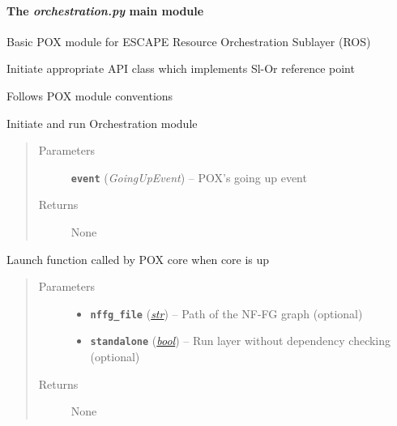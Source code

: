 \documentclass[letterpaper,10pt,english]{sphinxmanual}
\begin{document}
\paragraph{The \emph{orchestration.py} main module}
\label{orchestration:module-orchestration}\label{orchestration:the-orchestration-py-main-module}\label{orchestration::doc}
Basic POX module for ESCAPE Resource Orchestration Sublayer (ROS)

Initiate appropriate API class which implements Sl-Or reference point

Follows POX module conventions

\begin{fulllineitems}
\label{orchestration:orchestration._start_layer}
Initiate and run Orchestration module
\begin{quote}\begin{description}
\item[{Parameters}] \leavevmode
\textbf{\texttt{event}} (\emph{GoingUpEvent}) -- POX's going up event

\item[{Returns}] \leavevmode
None

\end{description}\end{quote}

\end{fulllineitems}


\begin{fulllineitems}
\label{orchestration:orchestration.launch}
Launch function called by POX core when core is up
\begin{quote}\begin{description}
\item[{Parameters}] \leavevmode\begin{itemize}
\item {} 
\textbf{\texttt{nffg\_file}} (\href{https://docs.python.org/2.7/library/functions.html\#str}{\emph{str}}) -- Path of the NF-FG graph (optional)

\item {} 
\textbf{\texttt{standalone}} (\href{https://docs.python.org/2.7/library/functions.html\#bool}{\emph{bool}}) -- Run layer without dependency checking (optional)

\end{itemize}

\item[{Returns}] \leavevmode
None

\end{description}\end{quote}

\end{fulllineitems}
\end{document}
